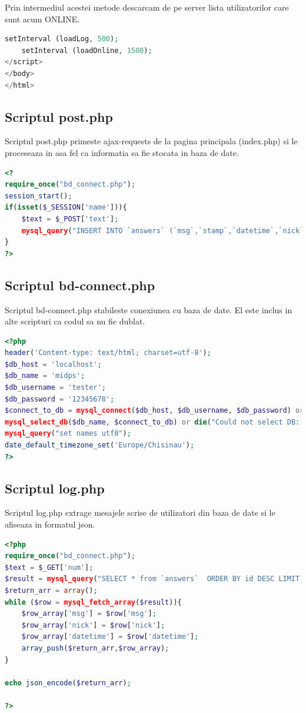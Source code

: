 \documentclass[12pt]{article}
\begin{document}
Prin intermediul acestei metode descarcam de pe server lista utilizatorilor care sunt acum ONLINE.
\begin{lstlisting}[language=php, caption={Fisierul index.php. setarea intervalului actualizarii log-ului de mesaje si listei de utilizatori}, label=list2]
	setInterval (loadLog, 500);
    setInterval (loadOnline, 1500);
</script>
</body>
</html>	
\end{lstlisting}

\subsection{Scriptul post.php}
Scriptul post.php primeste ajax-requests de la pagina principala (index.php) si le proceseaza in asa fel ca informatia sa fie stocata in baza de date.
\newpage
\begin{lstlisting}[language=php, caption={Fisierul post.php}, label=list2]
<?
require_once("bd_connect.php");
session_start();
if(isset($_SESSION['name'])){
    $text = $_POST['text'];
    mysql_query("INSERT INTO `answers` (`msg`,`stamp`,`datetime`,`nick`) VALUES ('".$_POST['text']."','".time()."','".date("g:i A")."','".$_SESSION['name']."')") or die(mysql_error());
}
?>
\end{lstlisting}
\subsection{Scriptul bd-connect.php}
Scriptul bd-connect.php stabileste conexiunea cu baza de date. El este inclus in alte scripturi ca codul sa nu fie dublat.
\begin{lstlisting}[language=php, caption={Fisierul bd-connect.php}, label=list2]
<?php
header('Content-type: text/html; charset=utf-8');
$db_host = 'localhost';
$db_name = 'midps';
$db_username = 'tester';
$db_password = '12345678';
$connect_to_db = mysql_connect($db_host, $db_username, $db_password) or die("Could not connect: " . mysql_error());
mysql_select_db($db_name, $connect_to_db) or die("Could not select DB: " . mysql_error());
mysql_query("set names utf8");
date_default_timezone_set('Europe/Chisinau');
?>
\end{lstlisting}
\subsection{Scriptul log.php}
Scriptul log.php extrage mesajele scrise de utilizatori din baza de date si le afiseaza in formatul json.
\newpage
\begin{lstlisting}[language=php, caption={Fisierul log.php}, label=list2]
<?php
require_once("bd_connect.php");
$text = $_GET['num'];
$result = mysql_query("SELECT * from `answers`  ORDER BY id DESC LIMIT ".$_GET['num']."") or die(mysql_error());
$return_arr = array();
while ($row = mysql_fetch_array($result)){
	$row_array['msg'] = $row['msg'];
	$row_array['nick'] = $row['nick'];
	$row_array['datetime'] = $row['datetime'];
	array_push($return_arr,$row_array);
}

echo json_encode($return_arr);

?>
\end{lstlisting}
\end{document}
